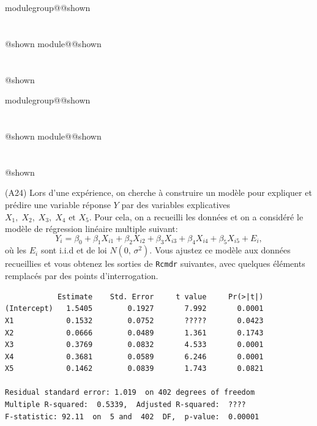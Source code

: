 \documentclass{Evaluation}
\makeatletter
\newcommand{\currentmodulekey}{}
\newcommand{\currentmoduletitle}{}
\newcommand{\currentgroupkey}{}
\newcommand{\currentgrouptitle}{}
\newcommand{\showmoduleifneeded}{%
  \ifx\currentgroupkey\empty\else
    \expandafter\ifx\csname modulegroup@\currentgroupkey @shown\endcsname\relax
      \section*{\currentgrouptitle}%
      \expandafter\gdef\csname modulegroup@\currentgroupkey @shown\endcsname{1}%
    \fi
  \fi
  \expandafter\ifx\csname module@\currentmodulekey @shown\endcsname\relax
    \section*{\currentmoduletitle}%
    \expandafter\gdef\csname module@\currentmodulekey @shown\endcsname{1}%
  \fi
}
\newenvironment{H24}{\showmoduleifneeded}{}
\newenvironment{A24}{\showmoduleifneeded}{}
\makeatother
\begin{document}
\begin{questions}
\begin{H24}
\begin{parts}
\begin{subparts}
\end{subparts}
\end{parts}
\end{H24}
\begin{A24}
\question (A24)
Lors d'une expérience, on cherche à construire un modèle pour expliquer et prédire une variable réponse $Y$ par des variables explicatives $X_1,\; X_2,\; X_3,\; X_4 \text{ et } X_5$. Pour cela, on a recueilli les données et on a considéré le modèle de régression linéaire multiple suivant:
$$Y_i=\beta_0+\beta_1X_{i1}+\beta_2X_{i2}+\beta_3X_{i3}+\beta_4X_{i4}+\beta_5X_{i5}+E_i,$$
où les $E_i$ sont  i.i.d et  de loi $N(0,\,\sigma^2).$
Vous ajustez ce modèle aux données recueillies et vous obtenez les sorties de \texttt{Rcmdr} suivantes, avec quelques éléments remplacés par des points d'interrogation.

\begin{verbatim}
            Estimate    Std. Error     t value     Pr(>|t|)
(Intercept)   1.5405        0.1927       7.992       0.0001
X1            0.1532        0.0752       ?????       0.0423 
X2            0.0666        0.0489       1.361       0.1743
X3            0.3769        0.0832       4.533       0.0001
X4            0.3681        0.0589       6.246       0.0001 
X5            0.1462        0.0839       1.743       0.0821 

Residual standard error: 1.019  on 402 degrees of freedom
Multiple R-squared:  0.5339,  Adjusted R-squared:  ????
F-statistic: 92.11  on  5 and  402  DF,  p-value:  0.00001
\end{verbatim}

\end{A24}
\end{questions}
\end{document}
